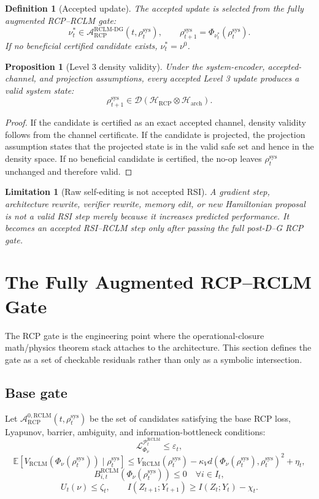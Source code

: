 \documentclass[11pt,a4paper]{article}
\newtheorem{proposition}[theorem]{Proposition}
\newtheorem{definition}[theorem]{Definition}
\newtheorem{limitation}[theorem]{Limitation}
\newcommand{\D}{\mathcal D}
\newcommand{\Hcal}{\mathcal H}
\newcommand{\Lcal}{\mathcal L}
\newcommand{\Pcal}{\mathcal P}
\newcommand{\Acal}{\mathcal A}
\newcommand{\eps}{\varepsilon}
\newcommand{\RCP}{\mathrm{RCP}}
\newcommand{\RCLM}{\mathrm{RCLM}}
\newcommand{\DG}{\mathrm{DG}}
\newcommand{\sys}{\mathrm{sys}}
\newcommand{\arch}{\mathrm{arch}}
\begin{document}
\begin{definition}[Accepted update]
The accepted update is selected from the fully augmented RCP--RCLM gate:
\[
\nu_t^*\in\Acal_{\RCP}^{\RCLM\text{-}\DG}(t,\rho_t^{\sys}),
\qquad
\rho_{t+1}^{\sys}=\Phi_{\nu_t^*}(\rho_t^{\sys}).
\]
If no beneficial certified candidate exists, \(\nu_t^*=\nu^0\).
\end{definition}

\begin{proposition}[Level 3 density validity]
\label{prop:level3-density-validity}
Under the system-encoder, accepted-channel, and projection assumptions, every accepted Level 3 update produces a valid system state:
\[
\rho_{t+1}^{\sys}\in\D(\Hcal_{\RCP}\otimes\Hcal_{\arch}).
\]
\end{proposition}

\begin{proof}
If the candidate is certified as an exact accepted channel, density validity follows from the channel certificate.  If the candidate is projected, the projection assumption states that the projected state is in the valid safe set and hence in the density space.  If no beneficial candidate is certified, the no-op leaves \(\rho_t^{\sys}\) unchanged and therefore valid.
\end{proof}

\begin{limitation}[Raw self-editing is not accepted RSI]
A gradient step, architecture rewrite, verifier rewrite, memory edit, or new Hamiltonian proposal is not a valid RSI step merely because it increases predicted performance.  It becomes an accepted RSI--RCLM step only after passing the full post-D--G RCP gate.
\end{limitation}


\section{The Fully Augmented RCP--RCLM Gate}

The RCP gate is the engineering point where the operational-closure math/physics theorem stack attaches to the architecture.  This section defines the gate as a set of checkable residuals rather than only as a symbolic intersection.

\subsection{Base gate}

Let \(\Acal_{\RCP}^{0,\RCLM}(t,\rho_t^{\sys})\) be the set of candidates satisfying the base RCP loss, Lyapunov, barrier, ambiguity, and information-bottleneck conditions:
\[
\Lcal^{\Pcal_t^{\RCLM}}_{\Phi_\nu}\le\eps_t,
\]
\[
\mathbb E[V_{\RCLM}(\Phi_\nu(\rho_t^{\sys}))\mid\rho_t^{\sys}]
\le
V_{\RCLM}(\rho_t^{\sys})-\kappa_Vd(\Phi_\nu(\rho_t^{\sys}),\rho_t^{\sys})^2+\eta_t,
\]
\[
B_{i,t}^{\RCLM}(\Phi_\nu(\rho_t^{\sys}))\le0\quad\forall i\in I_t,
\]
\[
U_t(\nu)\le\zeta_t,
\qquad
I(Z_{t+1};Y_{t+1})\ge I(Z_t;Y_t)-\chi_t.
\]
\end{document}
